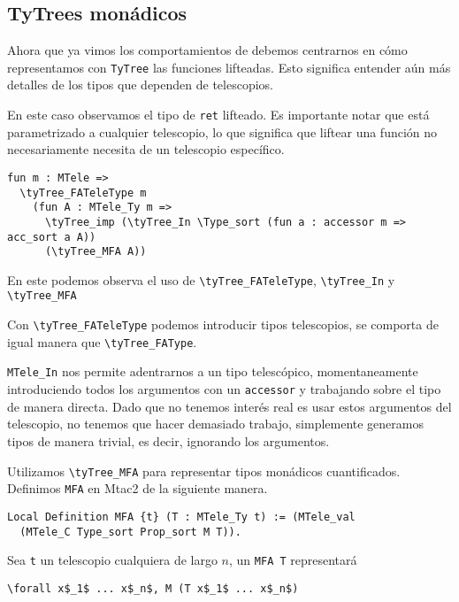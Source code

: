 \subsection{TyTrees monádicos}

Ahora que ya vimos los comportamientos de \lift{} debemos centrarnos en cómo representamos con \lstinline{TyTree} las funciones lifteadas.
Esto significa entender aún más detalles de los tipos que dependen de telescopios.

En este caso observamos el tipo de \lstinline{ret} lifteado.
Es importante notar que está parametrizado a cualquier telescopio, lo que significa que liftear una función no necesariamente necesita de un telescopio específico.

\begin{lstlisting}
fun m : MTele =>
  \tyTree_FATeleType m
    (fun A : MTele_Ty m =>
      \tyTree_imp (\tyTree_In \Type_sort (fun a : accessor m => acc_sort a A))
      (\tyTree_MFA A))
\end{lstlisting}

En este podemos observa el uso de \lstinline{\tyTree_FATeleType}, \lstinline{\tyTree_In} y \lstinline{\tyTree_MFA}

Con \lstinline{\tyTree_FATeleType} podemos introducir tipos telescopios, se comporta de igual manera que \lstinline{\tyTree_FAType}.

\lstinline{MTele_In} nos permite adentrarnos a un tipo telescópico, momentaneamente introduciendo todos los argumentos con un \lstinline{accessor} y trabajando sobre el tipo de manera directa.
Dado que no tenemos interés real es usar estos argumentos del telescopio, no tenemos que hacer demasiado trabajo, simplemente generamos tipos de manera trivial, es decir, ignorando los argumentos.

Utilizamos \lstinline{\tyTree_MFA} para representar tipos monádicos cuantificados. Definimos \lstinline{MFA} en Mtac2 de la siguiente manera.

\begin{lstlisting}
Local Definition MFA {t} (T : MTele_Ty t) := (MTele_val
  (MTele_C Type_sort Prop_sort M T)).
\end{lstlisting}

Sea \lstinline{t} un telescopio cualquiera de largo $n$, un \lstinline{MFA T} representará

\begin{lstlisting}
\forall x$_1$ ... x$_n$, M (T x$_1$ ... x$_n$)
\end{lstlisting}

